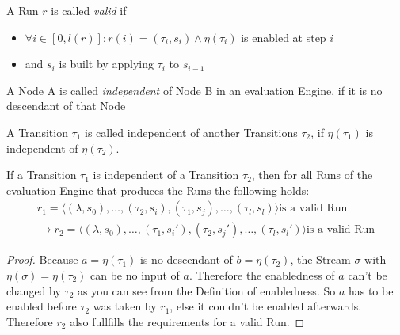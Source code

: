 \begin{definition}[name = Valid Run]\label{def:valid_run}
  A Run \(r\) is called \emph{valid} if
  \begin{itemize}
    \item \(\forall i \in [0,l(r)]: r(i) = (\tau_i,s_i) \land \eta(\tau_i)\) is enabled at step \(i\)
    \item and \(s_i\) is built by applying \(\tau_i\) to \(s_{i-1}\)
  \end{itemize}
\end{definition}

\begin{definition}[name = Independence of Nodes]\label{def:node_independent}
  A Node A is called \emph{independent} of Node B in an evaluation Engine, if it is no descendant of that Node
\end{definition}

\begin{definition}[name = Independence of Transitions]\label{def:independence_transitions}
  A Transition \(\tau_1\) is called independent of another Transitions \(\tau_2\), if \(\eta(\tau_1)\) is independent of \(\eta(\tau_2)\).
\end{definition}

\begin{lemma}[name = Exchange of independent Transitions]\label{lemma:exchange_independent_transitions}
  If a Transition \(\tau_1\) is independent of a Transition \(\tau_2\), then for all Runs of the evaluation Engine that produces the Runs the following holds:
  \begin{align*}
    r_1 = \langle (\lambda, s_0), \dots, (\tau_2, s_i), (\tau_1, s_j), \dots, (\tau_l, s_l) \rangle \text{is a valid Run} \\
    \rightarrow r_2 = \langle (\lambda, s_0), \dots, (\tau_1, s_i'), (\tau_2, s_j'), \dots, (\tau_l, s_l') \rangle \text{is a valid Run}
  \end{align*}
\end{lemma}

\begin{proof}
Because \(a = \eta(\tau_1)\) is no descendant of \(b = \eta(\tau_2)\), the Stream \(\sigma\) with \(\eta(\sigma) = \eta(\tau_2)\) can be no input of \(a\).
  Therefore the enabledness of \(a\) can't be changed by \(\tau_2\) as you can see from the Definition of enabledness.
  So \(a\) has to be enabled before \(\tau_2\) was taken by \(r_1\), else it couldn't be enabled afterwards.
  Therefore \(r_2\) also fullfills the requirements for a valid Run.
\end{proof}

